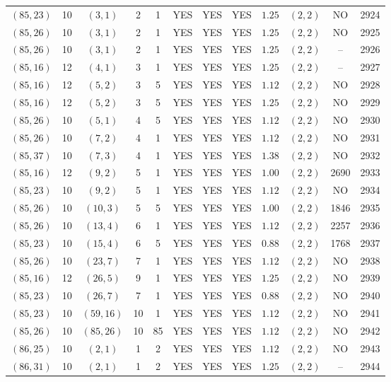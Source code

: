 \begin{longtable}{|c|c|c|c|c|c|c|c|c|c|c|c|}
$(85,23)$ & 10 & $(3,1)$ & 2 & 1 & YES & YES & YES & $1.25$ & $(2,2)$ & NO & 2924\\
$(85,26)$ & 10 & $(3,1)$ & 2 & 1 & YES & YES & YES & $1.25$ & $(2,2)$ & NO & 2925\\
$(85,26)$ & 10 & $(3,1)$ & 2 & 1 & YES & YES & YES & $1.25$ & $(2,2)$ & -- & 2926\\
$(85,16)$ & 12 & $(4,1)$ & 3 & 1 & YES & YES & YES & $1.25$ & $(2,2)$ & -- & 2927\\
$(85,16)$ & 12 & $(5,2)$ & 3 & 5 & YES & YES & YES & $1.12$ & $(2,2)$ & NO & 2928\\
$(85,16)$ & 12 & $(5,2)$ & 3 & 5 & YES & YES & YES & $1.25$ & $(2,2)$ & NO & 2929\\
$(85,26)$ & 10 & $(5,1)$ & 4 & 5 & YES & YES & YES & $1.12$ & $(2,2)$ & NO & 2930\\
$(85,26)$ & 10 & $(7,2)$ & 4 & 1 & YES & YES & YES & $1.12$ & $(2,2)$ & NO & 2931\\
$(85,37)$ & 10 & $(7,3)$ & 4 & 1 & YES & YES & YES & $1.38$ & $(2,2)$ & NO & 2932\\
$(85,16)$ & 12 & $(9,2)$ & 5 & 1 & YES & YES & YES & $1.00$ & $(2,2)$ & 2690 & 2933\\
$(85,23)$ & 10 & $(9,2)$ & 5 & 1 & YES & YES & YES & $1.12$ & $(2,2)$ & NO & 2934\\
$(85,26)$ & 10 & $(10,3)$ & 5 & 5 & YES & YES & YES & $1.00$ & $(2,2)$ & 1846 & 2935\\
$(85,26)$ & 10 & $(13,4)$ & 6 & 1 & YES & YES & YES & $1.12$ & $(2,2)$ & 2257 & 2936\\
$(85,23)$ & 10 & $(15,4)$ & 6 & 5 & YES & YES & YES & $0.88$ & $(2,2)$ & 1768 & 2937\\
$(85,26)$ & 10 & $(23,7)$ & 7 & 1 & YES & YES & YES & $1.12$ & $(2,2)$ & NO & 2938\\
$(85,16)$ & 12 & $(26,5)$ & 9 & 1 & YES & YES & YES & $1.25$ & $(2,2)$ & NO & 2939\\
$(85,23)$ & 10 & $(26,7)$ & 7 & 1 & YES & YES & YES & $0.88$ & $(2,2)$ & NO & 2940\\
$(85,23)$ & 10 & $(59,16)$ & 10 & 1 & YES & YES & YES & $1.12$ & $(2,2)$ & NO & 2941\\
$(85,26)$ & 10 & $(85,26)$ & 10 & 85 & YES & YES & YES & $1.12$ & $(2,2)$ & NO & 2942\\
$(86,25)$ & 10 & $(2,1)$ & 1 & 2 & YES & YES & YES & $1.12$ & $(2,2)$ & NO & 2943\\
$(86,31)$ & 10 & $(2,1)$ & 1 & 2 & YES & YES & YES & $1.25$ & $(2,2)$ & -- & 2944\\

\end{longtable}
